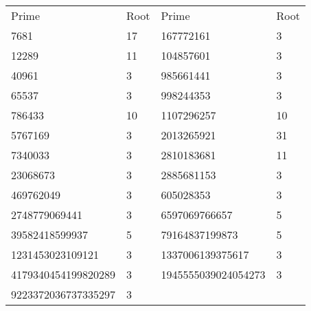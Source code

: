 \begin{tabular}{ l l l l }
    Prime & Root & Prime & Root \\
    7681  & 17 & 167772161 & 3 \\
    12289 & 11 & 104857601 & 3 \\
    40961 & 3 & 985661441 & 3 \\
    65537 & 3 & 998244353 & 3 \\   
    786433 & 10 & 1107296257 & 10 \\
    5767169 & 3 & 2013265921 & 31 \\
    7340033 & 3 & 2810183681 & 11 \\
    23068673 & 3 & 2885681153 & 3 \\
    469762049 & 3 & 605028353 & 3 \\
    2748779069441 & 3 & 6597069766657 & 5 \\
    39582418599937 & 5 & 79164837199873 & 5 \\
    1231453023109121 & 3 & 1337006139375617 & 3 \\
    4179340454199820289 & 3 & 1945555039024054273 & 3 \\
    9223372036737335297 & 3
\end{tabular}
